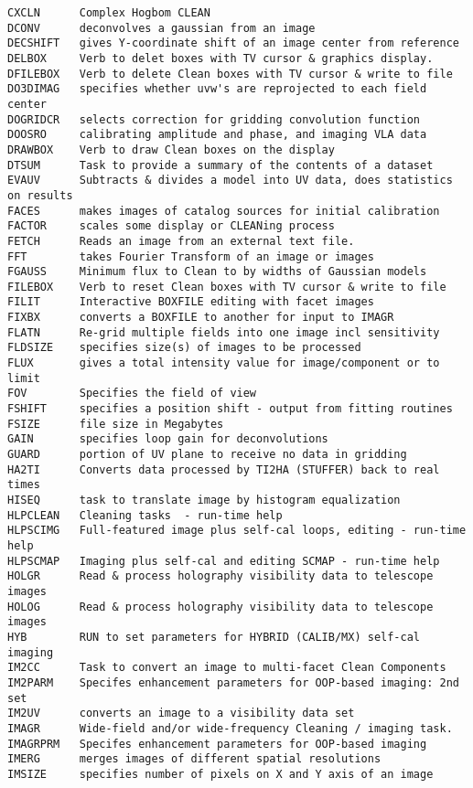 \begin{verbatim}
CXCLN      Complex Hogbom CLEAN
DCONV      deconvolves a gaussian from an image
DECSHIFT   gives Y-coordinate shift of an image center from reference
DELBOX     Verb to delet boxes with TV cursor & graphics display.
DFILEBOX   Verb to delete Clean boxes with TV cursor & write to file
DO3DIMAG   specifies whether uvw's are reprojected to each field center
DOGRIDCR   selects correction for gridding convolution function
DOOSRO     calibrating amplitude and phase, and imaging VLA data
DRAWBOX    Verb to draw Clean boxes on the display
DTSUM      Task to provide a summary of the contents of a dataset
EVAUV      Subtracts & divides a model into UV data, does statistics on results
FACES      makes images of catalog sources for initial calibration
FACTOR     scales some display or CLEANing process
FETCH      Reads an image from an external text file.
FFT        takes Fourier Transform of an image or images
FGAUSS     Minimum flux to Clean to by widths of Gaussian models
FILEBOX    Verb to reset Clean boxes with TV cursor & write to file
FILIT      Interactive BOXFILE editing with facet images
FIXBX      converts a BOXFILE to another for input to IMAGR
FLATN      Re-grid multiple fields into one image incl sensitivity
FLDSIZE    specifies size(s) of images to be processed
FLUX       gives a total intensity value for image/component or to limit
FOV        Specifies the field of view
FSHIFT     specifies a position shift - output from fitting routines
FSIZE      file size in Megabytes
GAIN       specifies loop gain for deconvolutions
GUARD      portion of UV plane to receive no data in gridding
HA2TI      Converts data processed by TI2HA (STUFFER) back to real times
HISEQ      task to translate image by histogram equalization
HLPCLEAN   Cleaning tasks  - run-time help
HLPSCIMG   Full-featured image plus self-cal loops, editing - run-time help
HLPSCMAP   Imaging plus self-cal and editing SCMAP - run-time help
HOLGR      Read & process holography visibility data to telescope images
HOLOG      Read & process holography visibility data to telescope images
HYB        RUN to set parameters for HYBRID (CALIB/MX) self-cal imaging
IM2CC      Task to convert an image to multi-facet Clean Components
IM2PARM    Specifes enhancement parameters for OOP-based imaging: 2nd set
IM2UV      converts an image to a visibility data set
IMAGR      Wide-field and/or wide-frequency Cleaning / imaging task.
IMAGRPRM   Specifes enhancement parameters for OOP-based imaging
IMERG      merges images of different spatial resolutions
IMSIZE     specifies number of pixels on X and Y axis of an image

\end{verbatim}
